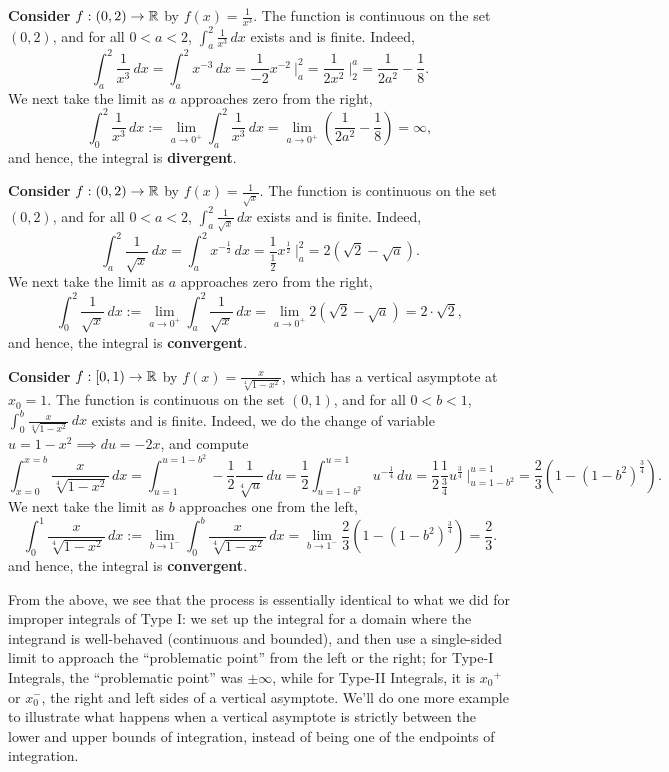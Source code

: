 \bigskip
\textbf{Consider} $f:(0, 2) \to \mathbb R$ by $f(x) = \frac{1}{x^3}$. The function is continuous on the set $(0, 2)$, and for all $0<a <2$,  $\int_{a}^2 \frac{1}{x^3} \, dx$ exists and is finite. Indeed,
 $$\int_{a}^2 \frac{1}{x^3} \, dx = \int_{a}^2 x^{-3} \, dx = \frac{1}{-2} x^{-2} ~\bigg|_{a}^2 = \frac{1}{2x^2} ~\bigg|_{2}^a = \frac{1}{2a^2} -  \frac{1}{8}.$$
We next take the limit as $a$ approaches zero from the right, 
$$\int_{0}^2 \frac{1}{x^3} \, dx :=\lim_{a \to 0^+} \int_{a}^2 \frac{1}{x^3} \, dx = \lim_{a \to 0^+} \left( \frac{1}{2a^2} -  \frac{1}{8} \right) = \infty,$$
and hence, the integral is \textbf{divergent}. 

\bigskip
\textbf{Consider} $f:(0, 2) \to \mathbb R$ by $f(x) = \frac{1}{\sqrt{x}}$. The function is continuous on the set $(0, 2)$, and for all $0<a <2$,  $\int_{a}^2 \frac{1}{\sqrt{x}} \, dx$ exists and is finite. Indeed,
 $$\int_{a}^2 \frac{1}{\sqrt{x}} \, dx = \int_{a}^2 x^{-\frac{1}{2}} \, dx = \frac{1}{\frac{1}{2}} x^{\frac{1}{2}} ~\bigg|_{a}^2 = 2 \left(\sqrt{2}  - \sqrt{a} \right).$$
We next take the limit as $a$ approaches zero from the right, 
$$\int_{0}^2 \frac{1}{\sqrt{x}} \, dx :=\lim_{a \to 0^+} \int_{a}^2  \frac{1}{\sqrt{x}} \, dx = \lim_{a \to 0^+} 2 \left(\sqrt{2}  - \sqrt{a} \right) =  2 \cdot \sqrt{2},$$
and hence, the integral is \textbf{convergent}.

\bigskip
\textbf{Consider}  $f:[0, 1) \to \mathbb R$ by $f(x) = \frac{x}{ \sqrt[4]{1-x^2} }$, which has a vertical asymptote at $x_0 = 1$. The function is continuous on the set $(0, 1)$, and for all $0<b <1$,  $\int_{0}^b\frac{x}{\sqrt[4]{1-x^2}} \, dx$ exists and is finite. Indeed, we do the change of variable $u = 1-x^2 \implies du = -2x$, and compute
 $$\int_{x=0}^{x=b} \frac{x}{ \sqrt[4]{1-x^2} } \, dx = \int_{u=1}^{ u=1-b^2 } - \frac{1}{2} \frac{1}{ \sqrt[4]{u} } \, du=    \frac{1}{2} \int_{ u=1-b^2 }^{u=1} u^{ -\frac{1}{4} } \, du = 
\frac{1}{2} \frac{1}{ \frac{3}{4} } u^{ \frac{3}{4} } ~\bigg|_{u=1-b^2}^{u=1} = \frac{2}{3} \left(1 -  \left(1-b^2\right)^{ \frac{3}{4} } \right).$$
We next take the limit as $b$ approaches one from the left, 
$$\int_{0}^1  \frac{x}{ \sqrt[4]{1-x^2} }\, dx :=\lim_{b \to 1^-} \int_{0}^b  \frac{x}{ \sqrt[4]{1-x^2} }\, dx  = \lim_{b \to 1^-} \frac{2}{3} \left(1 -  \left(1-b^2\right)^{ \frac{3}{4} } \right) =  \frac{2}{3}.$$
and hence, the integral is \textbf{convergent}.

From the above, we see that the process is essentially identical to what we did for improper integrals of Type I: we set up the integral for a domain where the integrand is well-behaved (continuous and bounded), and then use a single-sided limit to approach the ``problematic point'' from the left or the right; for Type-I Integrals, the ``problematic point'' was $\pm \infty$, while for Type-II Integrals, it is $x_0{^+}$ or $x_0^-$, the right and left sides of a vertical asymptote. We'll do one more example to illustrate what happens when a vertical asymptote is strictly between the lower and upper bounds of integration, instead of being one of the endpoints of integration. 


